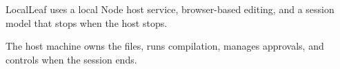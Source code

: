 LocalLeaf uses a local Node host service, browser-based editing, and a session model that stops when the host stops.

The host machine owns the files, runs compilation, manages approvals, and controls when the session ends.
